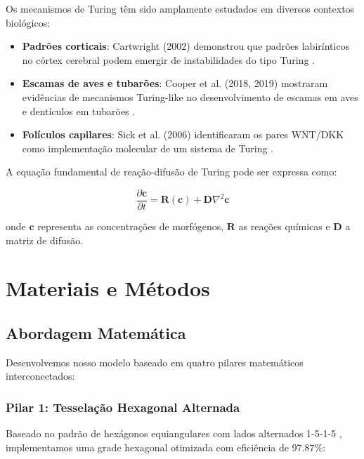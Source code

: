 \documentclass[12pt,a4paper,oneside]{extarticle}
\begin{document}
Os mecanismos de Turing têm sido amplamente estudados em diversos contextos biológicos:

\begin{itemize}
    \item \textbf{Padrões corticais}: Cartwright (2002) demonstrou que padrões labirínticos no córtex cerebral podem emergir de instabilidades do tipo Turing \cite{Cartwright2002}.
    \item \textbf{Escamas de aves e tubarões}: Cooper et al. (2018, 2019) mostraram evidências de mecanismos Turing-like no desenvolvimento de escamas em aves e dentículos em tubarões \cite{Cooper2018Shark, Cooper2019}.
    \item \textbf{Folículos capilares}: Sick et al. (2006) identificaram os pares WNT/DKK como implementação molecular de um sistema de Turing \cite{Sick2006}.
\end{itemize}

A equação fundamental de reação-difusão de Turing pode ser expressa como:

\begin{equation}
\frac{\partial \mathbf{c}}{\partial t} = \mathbf{R}(\mathbf{c}) + \mathbf{D} \nabla^2 \mathbf{c}
\end{equation}

onde $\mathbf{c}$ representa as concentrações de morfógenos, $\mathbf{R}$ as reações químicas e $\mathbf{D}$ a matriz de difusão.


\section{Materiais e Métodos}

\subsection{Abordagem Matemática}

Desenvolvemos nosso modelo baseado em quatro pilares matemáticos interconectados:

\subsubsection{Pilar 1: Tesselação Hexagonal Alternada}

Baseado no padrão de hexágonos equiangulares com lados alternados 1-5-1-5 \cite{mathstackexchange_hexagon_tiling_2016}, implementamos uma grade hexagonal otimizada com eficiência de 97.87\%:
\end{document}
